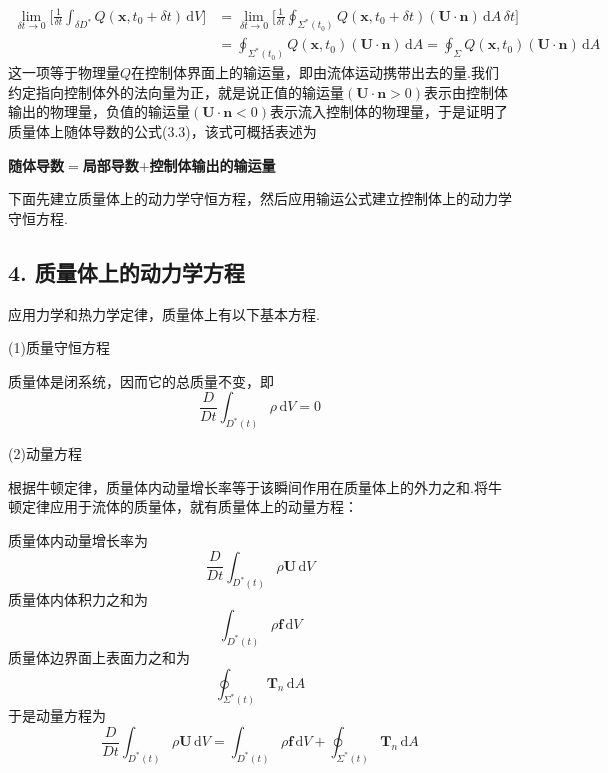 \begin{align*}
\lim_{\delta t\to 0}\bigg[\frac{1}{\delta t}\int_{\delta D^{*}}Q(\boldsymbol{x},t_0+\delta t)\,\mathrm{d}V\bigg]&=\lim_{\delta t\to 0}\bigg[\frac{1}{\delta t}\oint_{\Sigma^{*}(t_0)}Q(\boldsymbol{x},t_0+\delta t)(\boldsymbol{U}\cdot\boldsymbol{n})\,\mathrm{d}A\,\delta t\bigg]\\
&=\oint_{\Sigma^{*}(t_0)}Q(\boldsymbol{x},t_0)(\boldsymbol{U}\cdot\boldsymbol{n})\,\mathrm{d}A=\oint_\Sigma Q(\boldsymbol{x},t_0)(\boldsymbol{U}\cdot\boldsymbol{n})\,\mathrm{d}A
\end{align*}
这一项等于物理量$Q$在控制体界面上的输运量，即由流体运动携带出去的量.我们约定指向控制体外的法向量为正，就是说正值的输运量$(\boldsymbol{U}\cdot\boldsymbol{n}>0)$表示由控制体输出的物理量，负值的输运量$(\boldsymbol{U}\cdot\boldsymbol{n}<0)$表示流入控制体的物理量，于是证明了质量体上随体导数的公式(3.3)，该式可概括表述为

\textbf{随体导数$=$局部导数$+$控制体输出的输运量}

下面先建立质量体上的动力学守恒方程，然后应用输运公式建立控制体上的动力学守恒方程.

\subsection*{4. 质量体上的动力学方程}

应用力学和热力学定律，质量体上有以下基本方程.

(1)质量守恒方程

质量体是闭系统，因而它的总质量不变，即
\begin{equation*}
\frac{D}{Dt}\int_{D^{*}(t)}\rho\,\mathrm{d}V=0
\tag{3.5}
\end{equation*}

(2)动量方程

根据牛顿定律，质量体内动量增长率等于该瞬间作用在质量体上的外力之和.将牛顿定律应用于流体的质量体，就有质量体上的动量方程：

质量体内动量增长率为
\[
\frac{D}{Dt}\int_{D^{*}(t)}\rho\boldsymbol{U}\,\mathrm{d}V
\]
质量体内体积力之和为
\[
\int_{D^{*}(t)}\rho\boldsymbol{f}\,\mathrm{d}V
\]
质量体边界面上表面力之和为
\[
\oint_{\Sigma^{*}(t)}\boldsymbol{T}_n\,\mathrm{d}A
\]
于是动量方程为
\begin{equation*}
\frac{D}{Dt}\int_{D^{*}(t)}\rho\boldsymbol{U}\,\mathrm{d}V=\int_{D^{*}(t)}\rho\boldsymbol{f}\,\mathrm{d}V+\oint_{\Sigma^{*}(t)}\boldsymbol{T}_n\,\mathrm{d}A
\tag{3.6}
\end{equation*}

